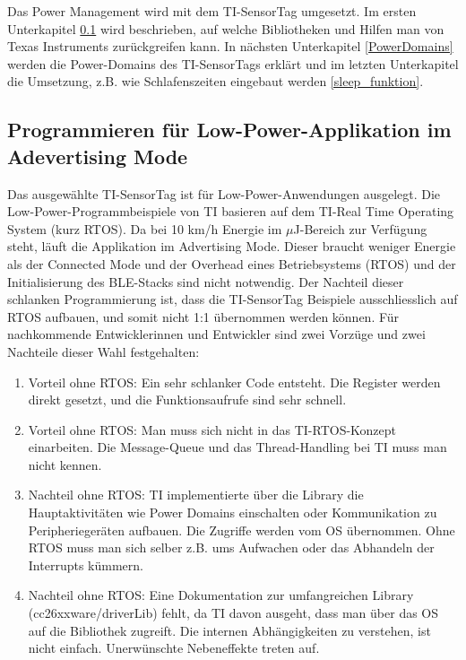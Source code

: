Das Power Management wird mit dem TI-SensorTag umgesetzt. Im ersten Unterkapitel \ref{keinROTS} wird beschrieben, auf welche Bibliotheken und Hilfen man von Texas Instruments zurückgreifen kann. In nächsten Unterkapitel \ref{PowerDomains} werden die Power-Domains des TI-SensorTags erklärt und im letzten Unterkapitel die Umsetzung, z.B. wie Schlafenszeiten eingebaut werden \ref{sleep_funktion}.


\subsection{Programmieren für Low-Power-Applikation im Adevertising Mode}
\label{keinROTS}

Das ausgewählte TI-SensorTag ist für Low-Power-Anwendungen ausgelegt. Die Low-Power-Programmbeispiele von TI basieren auf dem TI-Real Time Operating System (kurz RTOS). Da bei 10 km/h Energie im $\mu$J-Bereich zur Verfügung steht, läuft die Applikation im Advertising Mode. Dieser braucht weniger Energie als der Connected Mode und der Overhead eines Betriebsystems (RTOS) und der Initialisierung des BLE-Stacks sind nicht notwendig. Der Nachteil dieser schlanken Programmierung ist, dass die TI-SensorTag Beispiele ausschliesslich auf RTOS aufbauen, und somit nicht 1:1 übernommen werden können. Für nachkommende Entwicklerinnen und Entwickler sind zwei Vorzüge und zwei Nachteile dieser Wahl festgehalten:

\begin{minipage}{1\textwidth}
    \begin{enumerate}
        \item Vorteil ohne RTOS: Ein sehr schlanker Code entsteht. Die Register werden direkt gesetzt, und die Funktionsaufrufe sind sehr schnell.
        \item Vorteil ohne RTOS: Man muss sich nicht in das TI-RTOS-Konzept einarbeiten. Die Message-Queue und das Thread-Handling bei TI muss man nicht kennen.
        \item Nachteil ohne RTOS: TI implementierte über die Library die Hauptaktivitäten wie Power Domains einschalten oder Kommunikation zu Peripheriegeräten aufbauen. Die Zugriffe werden vom OS übernommen. Ohne RTOS muss man sich selber z.B. ums Aufwachen oder das Abhandeln der Interrupts kümmern.        
       \item Nachteil ohne RTOS: Eine Dokumentation zur umfangreichen Library (cc26xxware/driverLib) fehlt, da TI davon ausgeht, dass man über das OS auf die Bibliothek zugreift. Die internen Abhängigkeiten zu verstehen, ist nicht einfach. Unerwünschte Nebeneffekte treten auf.
    \end{enumerate}
\end{minipage}

